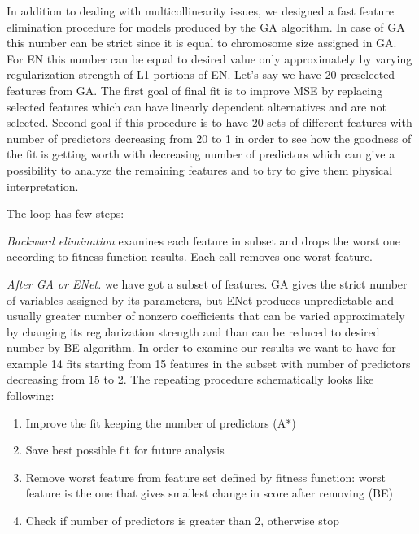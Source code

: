 \documentclass[aps,prl,reprint,amsmath,amssymb,nature]{revtex4-1}
\begin{document}
In addition to dealing with multicollinearity issues, we designed a fast feature elimination procedure for models produced by the GA algorithm. 
In case of GA this number can be strict since it is equal to chromosome size assigned in GA. 
For EN this number can be equal to desired value only approximately by varying regularization strength of L1 portions of EN. 
Let's say we have 20 preselected features from GA. 
The first goal of final fit is to improve MSE by replacing selected features which can have linearly dependent alternatives and are not selected. 
Second goal if this procedure is to have 20 sets of different features with number of predictors decreasing from 20 to 1 in order to see how the goodness of the fit is getting worth with decreasing number of predictors which can give a possibility to analyze the remaining features and to try to give them physical interpretation. 

The loop has few steps:

\blue

\textit{Backward elimination} examines each feature in subset and drops the worst one according to fitness function results. Each call removes one worst feature.

\textit{After GA or ENet.} we have got a subset of features. GA gives the strict number of variables assigned by its parameters, but ENet produces unpredictable and usually greater number of nonzero coefficients that can be varied approximately by changing its regularization strength and than can be reduced to desired number by BE algorithm. In order to examine our results we want to have for example 14 fits starting from 15 features in the subset with number of predictors decreasing from 15 to 2. 
The repeating procedure schematically looks like following:
\begin{enumerate}
\item Improve the fit keeping the number of predictors (A*)
\item Save best possible fit for future analysis
\item Remove worst feature from feature set defined by fitness function: worst feature is the one that gives smallest change in score after removing (BE)
\item Check if number of predictors is greater than 2, otherwise stop
\setcounter{numberedCntH}{\theenumi}
\end{enumerate}

\old
\end{document}
